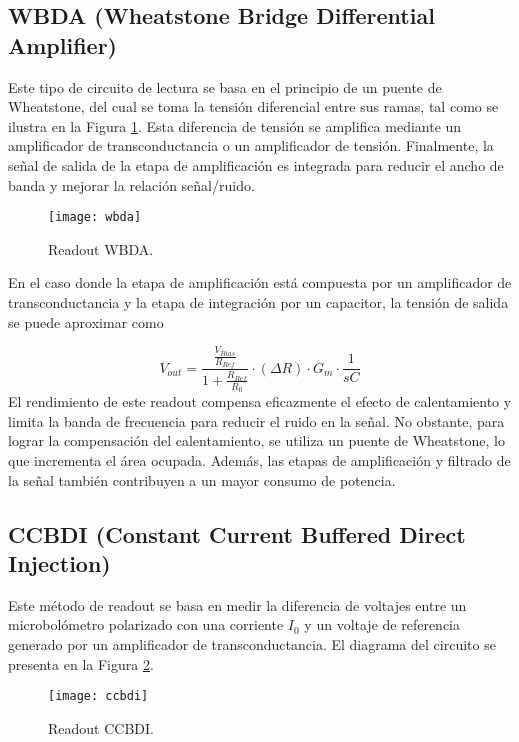 \subsection{WBDA (Wheatstone Bridge Differential Amplifier)}
Este tipo de circuito de lectura se basa en el principio de un puente de Wheatstone, del cual se toma la tensión diferencial entre sus ramas, tal como se ilustra en la Figura \ref{fig:wbda}. Esta diferencia de tensión se amplifica mediante un amplificador de transconductancia o un amplificador de tensión. Finalmente, la señal de salida de la etapa de amplificación es integrada para reducir el ancho de banda y mejorar la relación señal/ruido.
            \begin{figure}[hbtp]
                \centering
                \texttt{[image: wbda]}
                \caption{Readout WBDA.}
                \label{fig:wbda}
            \end{figure}


En el caso donde la etapa de amplificación está compuesta por un amplificador de transconductancia y la etapa de integración por un capacitor, la tensión de salida se puede aproximar como

        \begin{equation}
        V_{out} = \frac{\frac{V_{Bias}}{R_{Ref}}}{1+\frac{R_{Ref}}{R_{0}}}\cdot (\Delta R)\cdot G_{m}\cdot \frac{1}{sC}
        \label{eq:wbda}
        \end{equation}
El rendimiento de este readout compensa eficazmente el efecto de calentamiento y limita la banda de frecuencia para reducir el ruido en la señal. No obstante, para lograr la compensación del calentamiento, se utiliza un puente de Wheatstone, lo que incrementa el área ocupada. Además, las etapas de amplificación y filtrado de la señal también contribuyen a un mayor consumo de potencia.        
\newpage
\subsection{CCBDI (Constant Current Buffered Direct Injection)}
Este método de readout se basa en medir la diferencia de voltajes entre un microbolómetro polarizado con una corriente $I_{0}$ y un voltaje de referencia generado por un amplificador de transconductancia. El diagrama del circuito se presenta en la Figura \ref{fig:ccbdi}.
            \begin{figure}[hbtp]
                \centering
                \texttt{[image: ccbdi]}
                \caption{Readout CCBDI.}
                \label{fig:ccbdi}
            \end{figure}


